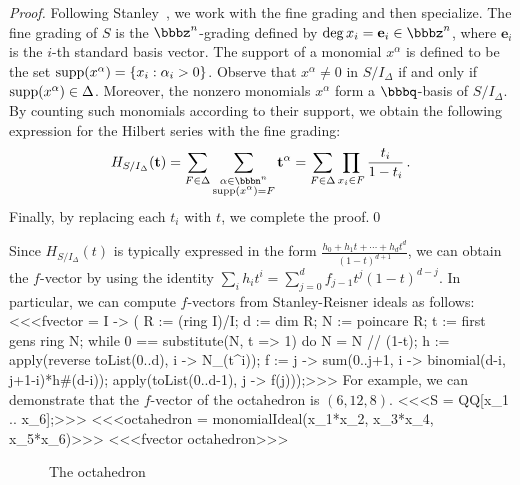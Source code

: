 \begin{proof}
Following Stanley~\cite{MR98h:05001}, we work with the fine
grading and then
specialize.  The fine grading of $S$ is the $\bbbz^{n}$-grading
defined by $\deg x_{i} = \mathbf{e}_{i} \in \bbbz^{n}$, where
$\mathbf{e}_{i}$ is the $i$-th standard basis vector.  The
support of a monomial $x^{\alpha}$ is defined
to be the set $\operatorname{supp}(x^{\alpha}) = \{ x_{i} : \alpha_{i} > 0 \}$.
Observe that $x^{\alpha} \neq 0$ in $S / I_{\Delta}$ if and only if
$\operatorname{supp}(x^{\alpha}) \in \Delta$.  Moreover, the nonzero monomials
$x^{\alpha}$ form a $\bbbq$-basis of $S / I_{\Delta}$.  By counting
such monomials according to their support, we obtain the following
expression for the Hilbert series with the fine grading:
\[
H_{S/I_{\Delta}}(\mathbf{t}) = \sum_{F \in \Delta}
\sum_{\substack{\alpha \in \bbbn^{n} \\ \supp(x^{\alpha}) = F}}
\mathbf{t}^{\alpha} = \sum_{F \in \Delta} \prod_{x_{i} \in F}
\frac{t_{i}}{1-t_{i}} \, .
\]
Finally, by replacing each $t_{i}$ with $t$, we complete the
proof.\qed
\end{proof}

Since $H_{S/I_{\Delta}}(t)$ is typically expressed in the form
$\frac{h_{0} + h_{1}t + \dotsb + h_{d}t^{d}}{(1-t)^{d+1}}$, we can
obtain the $f$-vector by using the identity $\sum_{i} h_{i}t^{i} =
\sum_{j=0}^{d} f_{j-1}t^{j}(1-t)^{d-j}$.  In particular, we can
compute $f$-vectors from Stanley-Reisner ideals as follows:
<<<fvector = I -> (
     R := (ring I)/I;
     d := dim R;
     N := poincare R;
     t := first gens ring N;
     while 0 == substitute(N, t => 1) do N = N // (1-t);
     h := apply(reverse toList(0..d), i -> N_(t^i));
     f := j -> sum(0..j+1, i -> binomial(d-i, j+1-i)*h#(d-i));
     apply(toList(0..d-1), j -> f(j)));>>>
For example, we can demonstrate that the $f$-vector of the octahedron
is $(6,12,8)$.
<<<S = QQ[x_1 .. x_6];>>>
<<<octahedron = monomialIdeal(x_1*x_2, x_3*x_4, x_5*x_6)>>>
<<<fvector octahedron>>>

\begin{figure}
\begin{center}
\epsfysize=1.8in 
\end{center}
\caption{The octahedron}
\end{figure}

